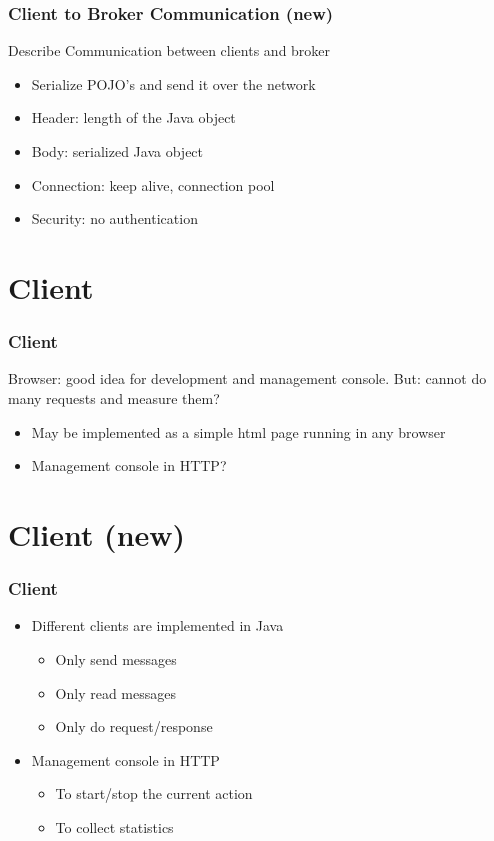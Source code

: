 \documentclass{beamer}
\begin{document}
\begin{frame}
\frametitle{Client to Broker Communication (new)}

Describe Communication between clients and broker
\begin{itemize}
\item Serialize POJO's and send it over the network
\item Header: length of the Java object
\item Body: serialized Java object
\item Connection: keep alive, connection pool
\item Security: no authentication
\end{itemize}
\end{frame}


\section{Client}
\begin{frame}
\frametitle{Client}
Browser: good idea for development and management console.
But: cannot do many requests and measure them?
\begin{itemize}
\item May be implemented as a simple html page running in any browser
\item Management console in HTTP?
\end{itemize}
\end{frame}


\section{Client (new)}
\begin{frame}
\frametitle{Client}
\begin{itemize}
\item Different clients are implemented in Java
\begin{itemize}
\item{Only send messages}
\item{Only read messages}
\item{Only do request/response}
\end{itemize}
\item Management console in HTTP
\begin{itemize}
\item{To start/stop the current action}
\item{To collect statistics}
\end{itemize}
\end{itemize}
\end{frame}
\end{document}
